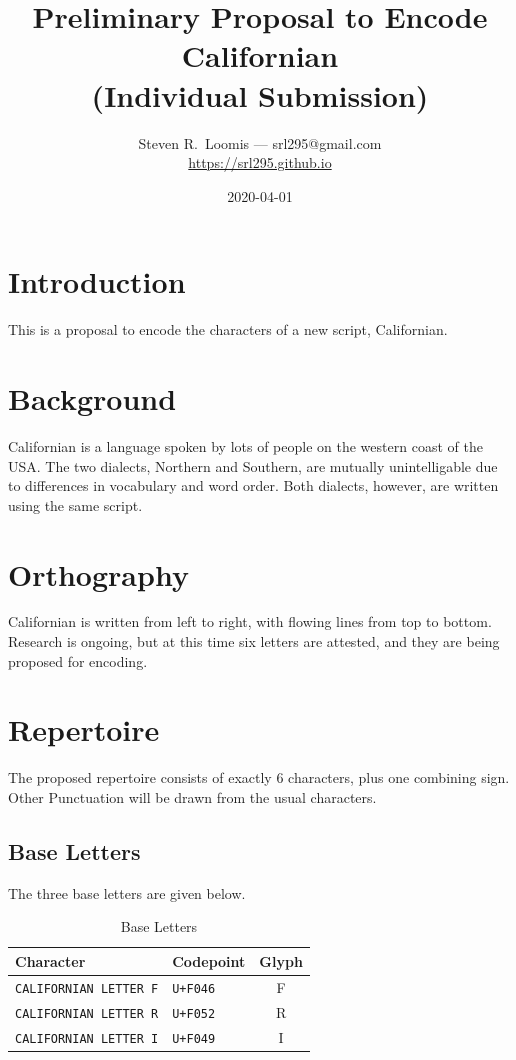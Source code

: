 \documentclass[12pt]{article}
\title{Preliminary Proposal to Encode Californian\\\normalsize \sf (Individual Submission)}
\author{Steven R.~Loomis — srl295@gmail.com\\\small\url{https://srl295.github.io}}
\date{2020-04-01}
\begin{document}
\newfontfamily{}
\newcommand\Cal[1]{{\calfont #1}}


\maketitle

\section{Introduction}

This is a proposal to encode the characters of a new script, Californian.

\section{Background}

Californian is a language spoken by lots of people on the western coast of the USA.
The two dialects, Northern and Southern, are mutually unintelligable due to differences
in vocabulary and word order. Both dialects, however, are written using the same script.

\section{Orthography}

Californian is written from left to right, with flowing lines from top to bottom.
Research is ongoing, but at this time six letters are attested, and they are being
proposed for encoding.

\section{Repertoire}

The proposed repertoire consists of exactly 6 characters, plus one combining sign.
Other Punctuation will
be drawn from the usual characters.

\subsection{Base Letters}

The three base letters are given below.

\begin{table}[h]
    \centering
    \caption{Base Letters}
    \begin{tabular}{| l | l | c |}
        \hline
            Character & Codepoint & Glyph \\
        \hline
        {\tt CALIFORNIAN LETTER F} & \tt{U+F046} & \Cal{F} \\
        {\tt CALIFORNIAN LETTER R} & \tt{U+F052} & \Cal{R} \\
        {\tt CALIFORNIAN LETTER I} & \tt{U+F049} & \Cal{I} \\
        \hline
        \hline
    \end{tabular}
\end{table}
\end{document}
